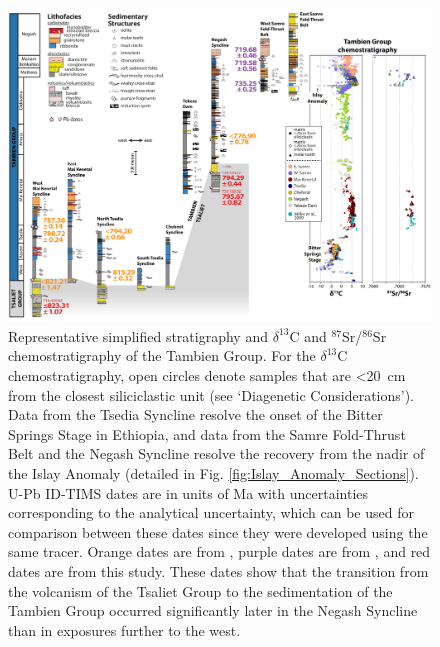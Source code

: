 \documentclass[11pt,letterpaper]{article}
\newcommand{\dC}{$\delta^{13}$C\xspace}
\newcommand{\SrSr}{$^{87}$Sr/$^{86}$Sr\xspace}
\begin{document}
\begin{figure}[h!]
\begin{center}
	\includegraphics[width=\textwidth]{Figures/Fence_Diagram.pdf}
	\caption{Representative simplified stratigraphy and \dC and \SrSr chemostratigraphy of the Tambien Group. For the \dC chemostratigraphy, open circles denote samples that are \textless20~cm from the closest siliciclastic unit (see `Diagenetic Considerations'). Data from the Tsedia Syncline resolve the onset of the Bitter Springs Stage in Ethiopia, and data from the Samre Fold-Thrust Belt and the Negash Syncline resolve the recovery from the nadir of the Islay Anomaly (detailed in Fig. \ref{fig:Islay_Anomaly_Sections}). U-Pb ID-TIMS dates are in units of Ma with uncertainties corresponding to the analytical uncertainty, which can be used for comparison between these dates since they were developed using the same tracer. Orange dates are from \citet{Swanson-Hysell2015a}, purple dates are from \citet{MacLennan2018a}, and red dates are from this study. These dates show that the transition from the volcanism of the Tsaliet Group to the sedimentation of the Tambien Group occurred significantly later in the Negash Syncline than in exposures further to the west.}
	\label{fig:Fence_Diagram}
\end{center}
\end{figure}
\end{document}
